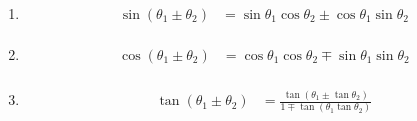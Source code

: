 \begin{Theorem}[$B2CK!DjM}(B]
\ \\ \par
\begin{enumerate}
\item 
\begin{align}
\begin{split}
\sin (\theta_{1} \pm \theta_{2}) &= \sin \theta_{1} \cos \theta_{2} \pm \cos \theta_{1}\sin \theta_{2} 
\end{split}
\end{align}
\item 
\begin{align}
\begin{split}
\cos (\theta_{1} \pm \theta_{2}) &= \cos \theta_{1} \cos \theta_{2} \mp \sin \theta_{1}\sin \theta_{2}
\end{split}
\end{align}
\item 
\begin{align}
\begin{split}
\tan(\theta_{1} \pm \theta_{2}) &= \frac{\tan(\theta_{1} \pm \tan \theta_{2})}{ 1 \mp \tan(\theta_{1} \tan \theta_{2})}
\end{split}
\end{align}
\end{enumerate}
\end{Theorem}


